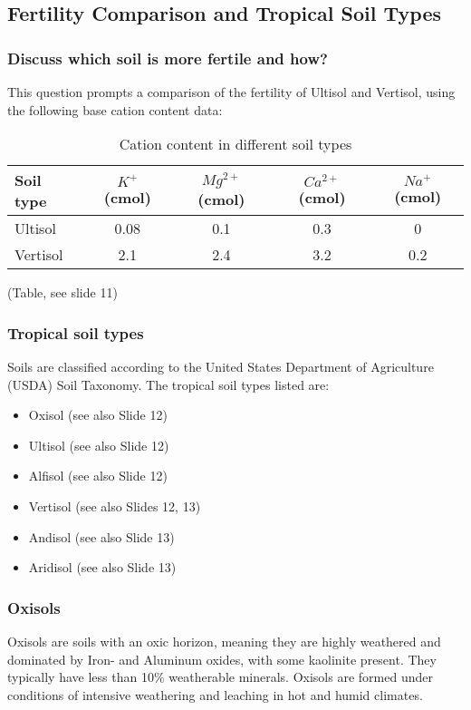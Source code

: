 \subsection{Fertility Comparison and Tropical Soil Types} \subsubsection{Discuss which soil is more fertile and how?} This question prompts a comparison of the fertility of Ultisol and Vertisol, using the following base cation content data:
\begin{table}[h]
    \centering
    \caption{Cation content in different soil types}
    \label{tab:soil_cations}
    \begin{tabular}{ l | c | c | c | c }
        \textbf{Soil type} & \textbf{$K^+$} (cmol) & \textbf{$Mg^{2+}$} (cmol) & \textbf{$Ca^{2+}$} (cmol) & \textbf{$Na^+$} (cmol) \\ 
        \hline
        Ultisol  & 0.08 & 0.1 & 0.3 & 0   \\
        Vertisol & 2.1  & 2.4 & 3.2 & 0.2 \\
    \end{tabular}
\end{table}

(Table, see slide 11) 

\subsubsection{Tropical soil types} Soils are classified according to the United States Department of Agriculture (USDA) Soil Taxonomy. The tropical soil types listed are: 

\begin{itemize} 
    \item Oxisol (see also Slide 12) 
    \item Ultisol (see also Slide 12) 
    \item Alfisol (see also Slide 12) 
    \item Vertisol (see also Slides 12, 13) 
    \item Andisol (see also Slide 13) 
    \item Aridisol (see also Slide 13) 
\end{itemize}

\subsubsection{Oxisols} Oxisols are soils with an oxic horizon, meaning they are highly weathered and dominated by Iron- and Aluminum oxides, with some kaolinite present. They typically have less than 10\% weatherable minerals. Oxisols are formed under conditions of intensive weathering and leaching in hot and humid climates.

